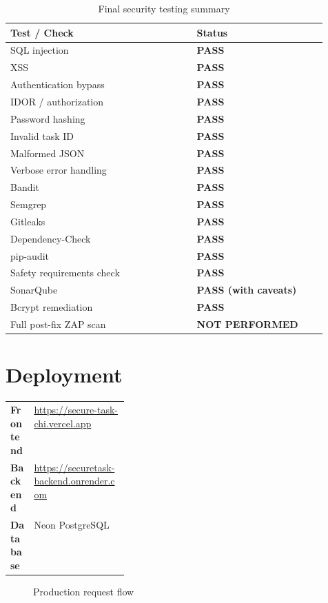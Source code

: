 \documentclass[11pt,a4paper]{article}
\newcommand{\tablehead}{\rowcolor{LightBlue}}
\newcommand{\pass}{\textcolor{PassGreen}{\textbf{PASS}}}
\newcommand{\passcav}{\textcolor{WarnAmber}{\textbf{PASS (with caveats)}}}
\newcommand{\notdone}{\textcolor{FailRed}{\textbf{NOT PERFORMED}}}
\begin{document}
\begin{table}[htbp]
\centering
\renewcommand{\arraystretch}{1.3}
\begin{tabular}{@{}L{0.5\linewidth}L{0.35\linewidth}@{}}
\toprule
\tablehead \textbf{Test / Check} & \textbf{Status} \\
\midrule
SQL injection & \pass \\
XSS & \pass \\
Authentication bypass & \pass \\
IDOR / authorization & \pass \\
Password hashing & \pass \\
Invalid task ID & \pass \\
Malformed JSON & \pass \\
Verbose error handling & \pass \\
\midrule
Bandit & \pass \\
Semgrep & \pass \\
Gitleaks & \pass \\
Dependency-Check & \pass \\
pip-audit & \pass \\
Safety requirements check & \pass \\
SonarQube & \passcav \\
Bcrypt remediation & \pass \\
Full post-fix ZAP scan & \notdone \\
\bottomrule
\end{tabular}
\caption{Final security testing summary}
\end{table}

\section{Deployment}

\begin{tabularx}{\linewidth}{@{}L{0.2\linewidth}X@{}}
\textbf{Frontend} & \url{https://secure-task-chi.vercel.app} \\
\textbf{Backend} & \url{https://securetask-backend.onrender.com} \\
\textbf{Database} & Neon PostgreSQL \\
\end{tabularx}

\vspace{0.4cm}
\begin{figure}[H]
\centering
{}
\caption{Production request flow}
\end{figure}
\end{document}
